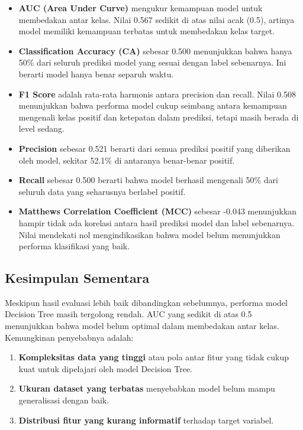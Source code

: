 \begin{itemize}
	\item \textbf{AUC (Area Under Curve)} mengukur kemampuan model untuk membedakan antar kelas. Nilai 0.567 sedikit di atas nilai acak (0.5), artinya model memiliki kemampuan terbatas untuk membedakan kelas target.
	
	\item \textbf{Classification Accuracy (CA)} sebesar 0.500 menunjukkan bahwa hanya 50\% dari seluruh prediksi model yang sesuai dengan label sebenarnya. Ini berarti model hanya benar separuh waktu.
	
	\item \textbf{F1 Score} adalah rata-rata harmonis antara precision dan recall. Nilai 0.508 menunjukkan bahwa performa model cukup seimbang antara kemampuan mengenali kelas positif dan ketepatan dalam prediksi, tetapi masih berada di level sedang.
	
	\item \textbf{Precision} sebesar 0.521 berarti dari semua prediksi positif yang diberikan oleh model, sekitar 52.1\% di antaranya benar-benar positif.
	
	\item \textbf{Recall} sebesar 0.500 berarti bahwa model berhasil mengenali 50\% dari seluruh data yang seharusnya berlabel positif.
	
	\item \textbf{Matthews Correlation Coefficient (MCC)} sebesar -0.043 menunjukkan hampir tidak ada korelasi antara hasil prediksi model dan label sebenarnya. Nilai mendekati nol mengindikasikan bahwa model belum menunjukkan performa klasifikasi yang baik.
\end{itemize}

\subsection*{Kesimpulan Sementara}

Meskipun hasil evaluasi lebih baik dibandingkan sebelumnya, performa model Decision Tree masih tergolong rendah. AUC yang sedikit di atas 0.5 menunjukkan bahwa model belum optimal dalam membedakan antar kelas. Kemungkinan penyebabnya adalah:

\begin{enumerate}
	\item \textbf{Kompleksitas data yang tinggi} atau pola antar fitur yang tidak cukup kuat untuk dipelajari oleh model Decision Tree.
	\item \textbf{Ukuran dataset yang terbatas} menyebabkan model belum mampu generalisasi dengan baik.
	\item \textbf{Distribusi fitur yang kurang informatif} terhadap target variabel.
\end{enumerate}


